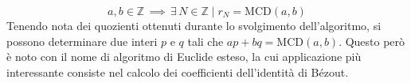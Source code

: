 \begin{equation}
    a,b \in \mathbb{Z} \,\implies \, \exists \, N\in \mathbb{Z} \mid r_N = \text{MCD}(a,b)
\end{equation}
Tenendo nota dei quozienti ottenuti durante lo svolgimento dell'algoritmo, si possono determinare due interi $p$ e $q$ tali che $ap+bq=\text{MCD}(a,b)$. Questo però è noto con il nome di algoritmo di Euclide esteso, la cui applicazione più interessante consiste nel calcolo dei coefficienti dell'identità di B\'ezout.\\